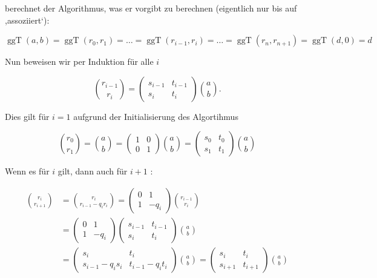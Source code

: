 \documentclass[10pt, letterpaper]{article}
\begin{document}
berechnet der Algorithmus, was er vorgibt zu berechnen (eigentlich nur bis auf ,assoziiert‘):

$$
\operatorname{ggT}(a, b)=\operatorname{ggT}\left(r_{0}, r_{1}\right)=\ldots=\operatorname{ggT}\left(r_{i-1}, r_{i}\right)=\ldots=\operatorname{ggT}\left(r_{n}, r_{n+1}\right)=\operatorname{ggT}(d, 0)=d
$$

Nun beweisen wir per Induktion für alle $i$

$$
\binom{r_{i-1}}{r_{i}}=\left(\begin{array}{cc}
s_{i-1} & t_{i-1} \\
s_{i} & t_{i}
\end{array}\right)\binom{a}{b} .
$$

Dies gilt für $i=1$ aufgrund der Initialisierung des Algortihmus

$$
\binom{r_{0}}{r_{1}}=\binom{a}{b}=\left(\begin{array}{ll}
1 & 0 \\
0 & 1
\end{array}\right)\binom{a}{b}=\left(\begin{array}{ll}
s_{0} & t_{0} \\
s_{1} & t_{1}
\end{array}\right)\binom{a}{b}
$$

Wenn es für $i$ gilt, dann auch für $i+1$ :

$$
\begin{aligned}
\binom{r_{i}}{r_{i+1}} & =\binom{r_{i}}{r_{i-1}-q_{i} r_{i}}=\left(\begin{array}{cc}
0 & 1 \\
1 & -q_{i}
\end{array}\right)\binom{r_{i-1}}{r_{i}} \\
& =\left(\begin{array}{cc}
0 & 1 \\
1 & -q_{i}
\end{array}\right)\left(\begin{array}{cc}
s_{i-1} & t_{i-1} \\
s_{i} & t_{i}
\end{array}\right)\binom{a}{b} \\
& =\left(\begin{array}{cc}
s_{i} & t_{i} \\
s_{i-1}-q_{i} s_{i} & t_{i-1}-q_{i} t_{i}
\end{array}\right)\binom{a}{b}=\left(\begin{array}{cc}
s_{i} & t_{i} \\
s_{i+1} & t_{i+1}
\end{array}\right)\binom{a}{b}
\end{aligned}
$$
\end{document}
